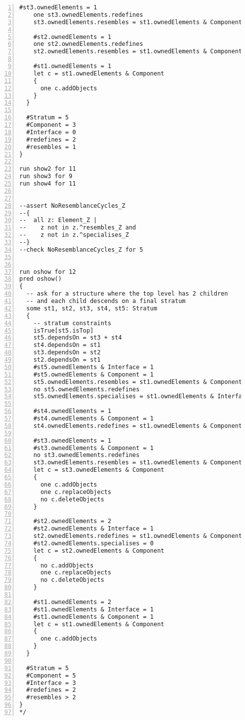 \begin{lstlisting}[caption={test.als}, numbers=left]
    #st3.ownedElements = 1
    one st3.ownedElements.redefines
    st3.ownedElements.resembles = st1.ownedElements & Component

    #st2.ownedElements = 1
    one st2.ownedElements.redefines
    st2.ownedElements.resembles = st1.ownedElements & Component
    
    #st1.ownedElements = 1
    let c = st1.ownedElements & Component
    {
      one c.addObjects
    }
  }
  
  #Stratum = 5
  #Component = 3
  #Interface = 0
  #redefines = 2
  #resembles = 1
}

run show2 for 11
run show3 for 9
run show4 for 11


--assert NoResemblanceCycles_Z
--{
--  all z: Element_Z |
--    z not in z.^resembles_Z and
--    z not in z.^specialises_Z
--}
--check NoResemblanceCycles_Z for 5


run oshow for 12
pred oshow()
{
  -- ask for a structure where the top level has 2 children
  -- and each child descends on a final stratum
  some st1, st2, st3, st4, st5: Stratum
  {
    -- stratum constraints
    isTrue[st5.isTop]
    st5.dependsOn = st3 + st4
    st4.dependsOn = st1
    st3.dependsOn = st2
    st2.dependsOn = st1
    #st5.ownedElements & Interface = 1
    #st5.ownedElements & Component = 1
    st5.ownedElements.resembles = st1.ownedElements & Component
    no st5.ownedElements.redefines
    st5.ownedElements.specialises = st1.ownedElements & Interface
    
    #st4.ownedElements = 1
    #st4.ownedElements & Component = 1
    st4.ownedElements.redefines = st1.ownedElements & Component

    #st3.ownedElements = 1
    #st3.ownedElements & Component = 1
    no st3.ownedElements.redefines
    st3.ownedElements.resembles = st1.ownedElements & Component
    let c = st3.ownedElements & Component
    {
      one c.addObjects
      one c.replaceObjects
      no c.deleteObjects
    }

    #st2.ownedElements = 2
    #st2.ownedElements & Interface = 1
    st2.ownedElements.redefines = st1.ownedElements & Component  
    #st2.ownedElements.specialises = 0
    let c = st2.ownedElements & Component
    {
      no c.addObjects
      one c.replaceObjects
      no c.deleteObjects
    }
    
    #st1.ownedElements = 2
    #st1.ownedElements & Interface = 1
    #st1.ownedElements & Component = 1
    let c = st1.ownedElements & Component
    {
      one c.addObjects
    }
  }
  
  #Stratum = 5
  #Component = 5
  #Interface = 3
  #redefines = 2
  #resembles > 2
}
*/
\end{lstlisting}